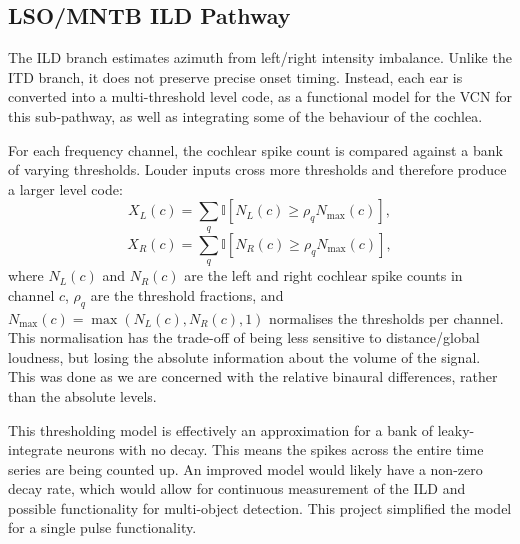 \subsection{LSO/MNTB ILD Pathway}

The ILD branch estimates azimuth from left/right intensity imbalance. Unlike the ITD branch, it does not preserve precise onset timing. Instead, each ear is converted into a multi-threshold level code, as a functional model for the VCN for this sub-pathway, as well as integrating some of the behaviour of the cochlea.

For each frequency channel, the cochlear spike count is compared against a bank of varying thresholds. Louder inputs cross more thresholds and therefore produce a larger level code:
\begin{equation}
    X_L(c) =
    \sum_q
    \mathbb{I}
    \left[
        N_L(c) \geq \rho_q N_{\max}(c)
    \right],
\end{equation}
\begin{equation}
    X_R(c) =
    \sum_q
    \mathbb{I}
    \left[
        N_R(c) \geq \rho_q N_{\max}(c)
    \right],
\end{equation}
where $N_L(c)$ and $N_R(c)$ are the left and right cochlear spike counts in channel $c$, $\rho_q$ are the threshold fractions, and $N_{\max}(c)=\max(N_L(c),N_R(c),1)$ normalises the thresholds per channel. This normalisation has the trade-off of being less sensitive to distance/global loudness, but losing the absolute information about the volume of the signal. This was done as we are concerned with the relative binaural differences, rather than the absolute levels. 

This thresholding model is effectively an approximation for a bank of leaky-integrate neurons with no decay. This means the spikes across the entire time series are being counted up. An improved model would likely have a non-zero decay rate, which would allow for continuous measurement of the ILD and possible functionality for multi-object detection. This project simplified the model for a single pulse functionality.

